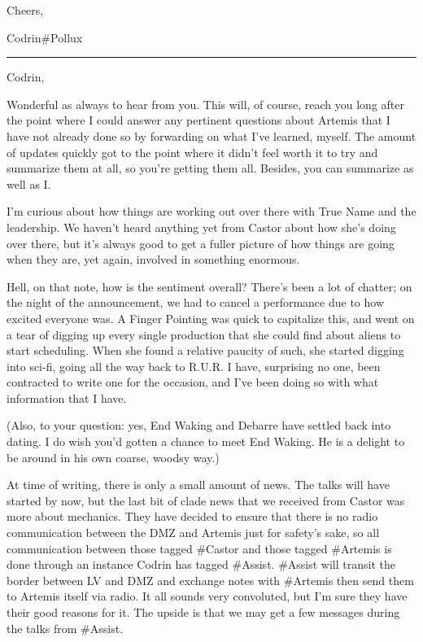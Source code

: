 Cheers,

Codrin\#Pollux

\begin{center}\rule{0.5\linewidth}{0.5pt}\end{center}

Codrin,

Wonderful as always to hear from you. This will, of course, reach you long after the point where I could answer any pertinent questions about Artemis that I have not already done so by forwarding on what I've learned, myself. The amount of updates quickly got to the point where it didn't feel worth it to try and summarize them at all, so you're getting them all. Besides, you can summarize as well as I.

I'm curious about how things are working out over there with True Name and the leadership. We haven't heard anything yet from Castor about how she's doing over there, but it's always good to get a fuller picture of how things are going when they are, yet again, involved in something enormous.

Hell, on that note, how is the sentiment overall? There's been a lot of chatter; on the night of the announcement, we had to cancel a performance due to how excited everyone was. A Finger Pointing was quick to capitalize this, and went on a tear of digging up every single production that she could find about aliens to start scheduling. When she found a relative paucity of such, she started digging into sci-fi, going all the way back to R.U.R. I have, surprising no one, been contracted to write one for the occasion, and I've been doing so with what information that I have.

(Also, to your question: yes, End Waking and Debarre have settled back into dating. I do wish you'd gotten a chance to meet End Waking. He is a delight to be around in his own coarse, woodsy way.)

At time of writing, there is only a small amount of news. The talks will have started by now, but the last bit of clade news that we received from Castor was more about mechanics. They have decided to ensure that there is no radio communication between the DMZ and Artemis just for safety's sake, so all communication between those tagged \#Castor and those tagged \#Artemis is done through an instance Codrin has tagged \#Assist. \#Assist will transit the border between LV and DMZ and exchange notes with \#Artemis then send them to Artemis itself via radio. It all sounds very convoluted, but I'm sure they have their good reasons for it. The upside is that we may get a few messages during the talks from \#Assist.


